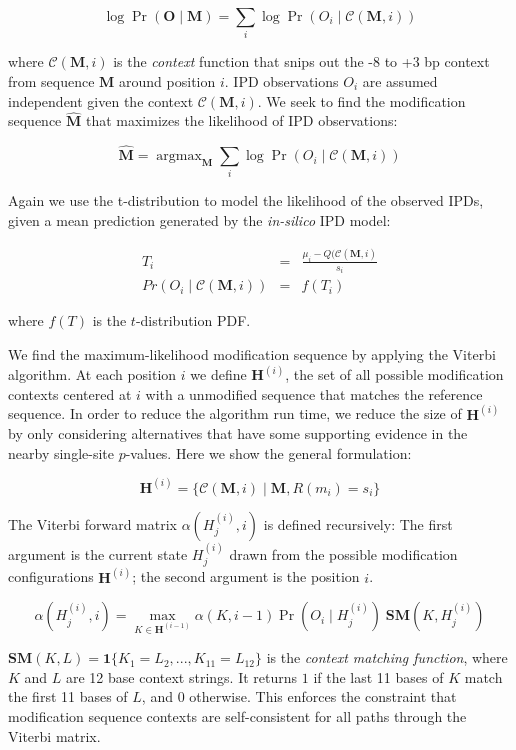 \documentclass[pdftex]{article}
\DeclareMathOperator*{\argmax}{argmax}
\begin{document}
$$
\log \Pr(\mathbf{O} \mid \mathbf{M}) = \sum_i \log \Pr(O_i \mid \mathcal{C}(\mathbf{M}, i))
$$

where $\mathcal{C}(\mathbf{M}, i)$ is the \emph{context} function that snips out the -8 to +3 bp context from sequence $\mathbf{M}$ around position $i$.
IPD observations $O_i$ are assumed independent given the context $\mathcal{C}(\mathbf{M}, i)$.  We seek to find the modification sequence $\hat{\mathbf{M}}$ that maximizes the likelihood of IPD observations: 

$$
\hat{\mathbf{M}} = \argmax_{\mathbf{M}} \sum_i \log \Pr(O_i \mid \mathcal{C}(\mathbf{M}, i)) 
$$

Again we use the t-distribution to model the likelihood of the observed IPDs, given a mean prediction generated by the \emph{in-silico} IPD model:

\begin{eqnarray}
T_i & = & \frac{\mu_i - Q(\mathcal{C}(\mathbf{M}, i)}{s_i} \\
Pr(O_i \mid \mathcal{C}(\mathbf{M}, i)) & = & f(T_i)
\end{eqnarray}

where $f(T)$ is the $t$-distribution PDF.

We find the maximum-likelihood modification sequence by applying the Viterbi algorithm\cite{forney1973viterbi}. At each position $i$ we define $\mathbf{H}^{(i)}$, the set of all possible modification contexts centered at $i$ with a unmodified sequence that matches the reference sequence. In order to reduce the algorithm run time, we reduce the size of $\mathbf{H}^{(i)}$ by only considering alternatives that have some supporting evidence in the nearby single-site $p$-values. Here we show the general formulation:

$$
\mathbf{H}^{(i)} = \{ \mathcal{C}(\mathbf{M}, i) \mid \mathbf{M}, R(m_i) = s_i \} 
$$

The Viterbi forward matrix $\alpha(H^{(i)}_j, i)$ is defined recursively: The first argument is the current state $H^{(i)}_j$ drawn from the possible modification configurations $\mathbf{H}^{(i)}$; the second argument is the position $i$.

$$
\alpha(H^{(i)}_j, i) = \max_{K \in \mathbf{H}^{(i-1)}} \alpha(K, i-1) \Pr(O_i \mid H^{(i)}_j) \; \mathbf{SM}(K, H^{(i)}_j)
$$

$\mathbf{SM}(K, L) = \mathbf{1}\{K_1=L_2, ..., K_{11}=L_{12}\}$ is the \emph{context matching function}, where $K$ and $L$ are 12 base context strings. It returns $1$ if the last 11 bases of $K$ match the first 11 bases of $L$, and $0$ otherwise. This enforces the constraint that modification sequence contexts are self-consistent for all paths through the Viterbi matrix.
\end{document}
